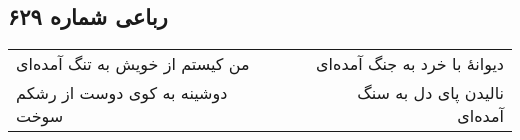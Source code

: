 \begin{center}
\section*{رباعی شماره ۶۲۹}
\label{sec:sh629}
\begin{longtable}{l p{0.5cm} r}
من کیستم از خویش به تنگ آمده‌ای
&&
دیوانهٔ با خرد به جنگ آمده‌ای
\\
دوشینه به کوی دوست از رشکم سوخت
&&
نالیدن پای دل به سنگ آمده‌ای
\\
\end{longtable}
\end{center}
